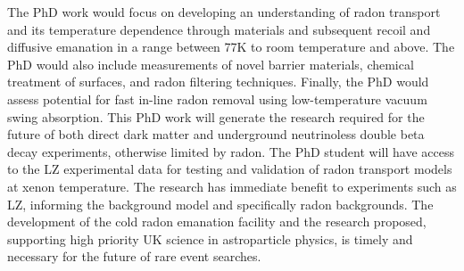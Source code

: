 The PhD work would focus on developing an understanding of radon transport and its temperature dependence through materials and subsequent recoil and diffusive emanation in a range between 77K to room temperature and above. The PhD would also include measurements of novel barrier materials, chemical treatment of surfaces, and radon filtering techniques. Finally, the PhD would assess potential for fast in-line radon removal using low-temperature vacuum swing absorption. This PhD work will generate the research required for the future of both direct dark matter and underground neutrinoless double beta decay experiments, otherwise limited by radon. The PhD student will have access to the LZ experimental data for testing and validation of radon transport models at xenon temperature. The research has immediate benefit to experiments such as LZ, informing the background model and specifically radon backgrounds. The development of the cold radon emanation facility and the research proposed, supporting high priority UK science in astroparticle physics​, is timely and necessary for the future of rare event searches.